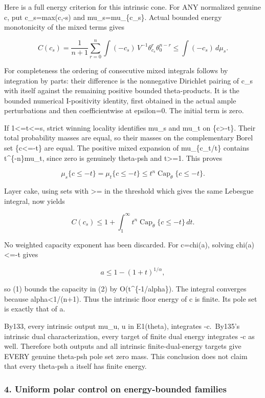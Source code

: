 \documentclass[
]{article}
\begin{document}
Here is a full energy criterion for this intrinsic cone. For ANY
normalized genuine c, put c\_s=max(c,-s) and mu\_s=mu\_\{c\_s\}. Actual
bounded energy monotonicity of the mixed terms gives

\[C(c_s)=\frac1{n+1}\sum_{r=0}^{n}\int(-c_s)\,V^{-1}\theta_{c_s}^r\theta_0^{n-r}
\leq\int(-c_s)\,d\mu_s.\]

For completeness the ordering of consecutive mixed integrals follows by
integration by parts: their difference is the nonnegative Dirichlet
pairing of c\_s with itself against the remaining positive bounded
theta-products. It is the bounded numerical I-positivity identity, first
obtained in the actual ample perturbations and then coefficientwise at
epsilon=0. The initial term is zero.

If 1\textless=t\textless=s, strict winning locality identifies mu\_s and
mu\_t on \{c\textgreater-t\}. Their total probability masses are equal,
so their masses on the complementary Borel set \{c\textless=-t\} are
equal. The positive mixed expansion of mu\_\{c\_t/t\} contains
t\^{}\{-n\}mu\_t, since zero is genuinely theta-psh and t\textgreater=1.
This proves

\[\mu_s\{c\leq-t\}=\mu_t\{c\leq-t\}
\leq t^n\operatorname{Cap}_\theta\{c\leq-t\}.\]

Layer cake, using sets with \textgreater= in the threshold which gives
the same Lebesgue integral, now yields

\[C(c_s)\leq1+\int_1^\infty t^n\operatorname{Cap}_\theta\{c\leq-t\}\,dt.\tag{2}\]

No weighted capacity exponent has been discarded. For c=chi(a), solving
chi(a)\textless=-t gives

\[a\leq1-(1+t)^{1/\alpha},\]

so (1) bounds the capacity in (2) by O(t\^{}\{-1/alpha\}). The integral
converges because alpha\textless1/(n+1). Thus the intrinsic floor energy
of c is finite. Its pole set is exactly that of a.

By133, every intrinsic output mu\_u, u in E1(theta), integrates
-c.~By135's intrinsic dual characterization, every target of finite dual
energy integrates -c as well. Therefore both outputs and all intrinsic
finite-dual-energy targets give EVERY genuine theta-psh pole set zero
mass. This conclusion does not claim that every theta-psh a itself has
finite energy.

\subsubsection{4. Uniform polar control on energy-bounded
families}\label{uniform-polar-control-on-energy-bounded-families}
\end{document}
